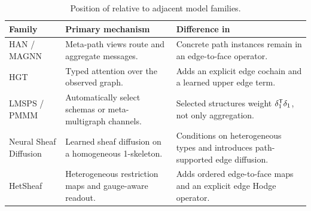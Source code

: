 \begin{table}[t]
  \centering
  \caption{Position of \method{} relative to adjacent model families.}
  \label{tab:positioning}
  \small
  \begin{tabular}{p{}p{}p{}}
    \toprule
    \textbf{Family} & \textbf{Primary mechanism} & \textbf{Difference in \method{}} \\
    \midrule
    HAN / MAGNN & Meta-path views route and aggregate messages. & Concrete path instances remain in an edge-to-face operator. \\
    HGT & Typed attention over the observed graph. & Adds an explicit edge cochain and a learned upper edge term. \\
    LMSPS / PMMM & Automatically select schemas or meta-multigraph channels. & Selected structures weight $\delta_1^{\mathsf{T}}\delta_1$, not only aggregation. \\
    Neural Sheaf Diffusion & Learned sheaf diffusion on a homogeneous 1-skeleton. & Conditions on heterogeneous types and introduces path-supported edge diffusion. \\
    HetSheaf & Heterogeneous restriction maps and gauge-aware readout. & Adds ordered edge-to-face maps and an explicit edge Hodge operator. \\
    \bottomrule
  \end{tabular}
\end{table}

